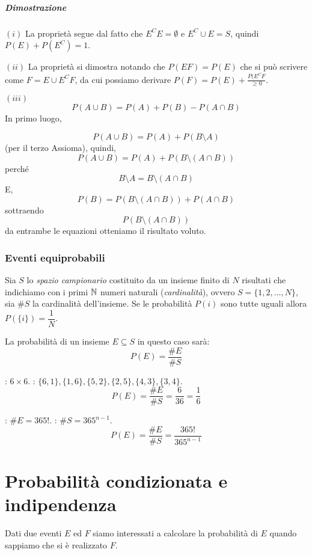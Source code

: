 \paragraph{Dimostrazione}%
\label{par:Dimostrazione}
$(i)$ La proprietà segue dal fatto che $E^CE=\emptyset$ e $E^C\cup E=S$, quindi
$P(E)+P(E^C)=1$.

$(ii)$ La proprietà si dimostra notando che $P(EF)=P(E)$ che si può scrivere
come $F=E\cup E^CF$, da cui possiamo derivare $P(F)=P(E)+\frac{P(E^C F}{\geq0}$.

 $(iii)$
\[P(A\cup B)=P(A)+P(B)-P(A\cap B)\]
In primo luogo,

\[P(A\cup B)=P(A)+P(B\setminus A)\]
 (per il terzo Assioma), quindi,
\[P(A\cup B)=P(A)+P(B\setminus (A\cap B))\]
perché
 \[B\setminus A=B\setminus (A\cap B)\]
E,
\[P(B)=P(B\setminus (A\cap B))+P(A\cap B)\]
sottraendo 
\[P(B\setminus (A\cap B))\]
da entrambe le equazioni otteniamo il risultato voluto.

\subsection{Eventi equiprobabili}%
\label{sub:Eventi equiprobabili}
Sia $S$ lo \emph{spazio campionario} costituito da un insieme finito di $N$
risultati che indichiamo con i primi $\mathbb{N}$ numeri naturali (\emph{cardinalità}),
ovvero $S=\{1,2,\dots,N\}$, sia $\#S$ la cardinalità dell'insieme.
Se le probabilità $P(i)$ sono tutte uguali allora $P(\{i\})=\dfrac{1}{N}$.

La probabilità di un insieme $E\subseteq S$ in questo caso sarà:
\[
  P(E)=\frac{\#E}{\#S}
\]

\begin{esercizio}

  : $6\times6$.
  : $\{6,1\},\{1,6\},\{5,2\},\{2,5\},\{4,3\},\{3,4\}$.
  \[
    P(E)=\frac{\#E}{\#S}=\frac{6}{36}= \frac{1}{6} 
  \]
\end{esercizio}

\begin{esercizio}
  : $\#E=365!$.
  : $\#S=365^{n-1}$. 
  \[
    P(E)=\frac{\#E}{\#S}=\frac{365!}{365^{n-1}}
  \]
\end{esercizio}

\chapter{Probabilità condizionata e indipendenza}%
\label{sec:Probabilità condizionata e indipendenza}
Dati due eventi $E$ ed $F$ siamo interessati a calcolare la probabilità di $E$
quando sappiamo che si è realizzato $F$.

